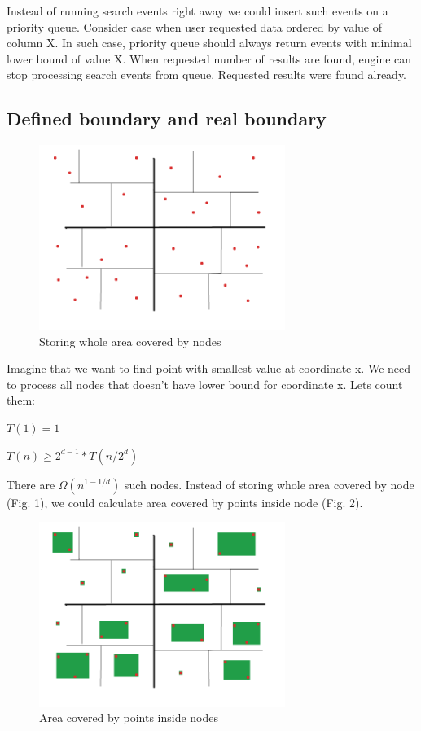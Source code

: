 \documentclass{llncs}
\begin{document}
Instead of running search events right away we could insert such events on a priority queue. Consider case when user requested data ordered by value of column X. In such case, priority queue should always return events with minimal lower bound of value X. When requested number of results are found, engine can stop processing search events from queue. Requested results were found already.

\subsection{Defined boundary and real boundary}

\begin{figure}
\centering
  \includegraphics[width=8cm]{simple_boundary.png}%
  \caption{Storing whole area covered by nodes}
\end{figure}

Imagine that we want to find point with smallest value at coordinate x. We need to process all nodes
that doesn't have lower bound for coordinate x. Lets count them:
\bigskip

$T(1) = 1$

$T(n) \geq 2^{d-1} * T(n/2^{d})$

\bigskip

There are $\Omega (n^{1-1/d})$ such nodes. Instead of storing whole area covered by node (Fig. 1), we could calculate area covered by points inside node (Fig. 2).

\begin{figure}
\centering
  \includegraphics[width=8cm]{simple_boundary2.png}%
  \caption{Area covered by points inside nodes}
\end{figure}
\end{document}
